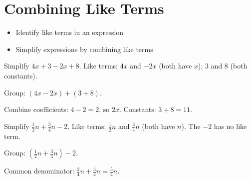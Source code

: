 \section{Combining Like Terms}

\begin{stepGoal}
\begin{itemize}
    \item Identify like terms in an expression
    \item Simplify expressions by combining like terms
\end{itemize}
\end{stepGoal}

\begin{stepVocabBox}
\end{stepVocabBox}

\begin{stepsCard}
\end{stepsCard}

\begin{stepExample}{Simplify $4x + 3 - 2x + 8$.}
     Like terms: $4x$ and $-2x$ (both have $x$); $3$ and $8$ (both constants).

     Group: $(4x - 2x) + (3 + 8)$.

     Combine coefficients: $4 - 2 = 2$, so $2x$. Constants: $3 + 8 = 11$.
\end{stepExample}

\begin{stepExample}{Simplify $\frac{1}{2}n + \frac{3}{4}n - 2$.}
     Like terms: $\frac{1}{2}n$ and $\frac{3}{4}n$ (both have $n$). The $-2$ has no like term.

     Group: $\left(\frac{1}{2}n + \frac{3}{4}n\right) - 2$.

     Common denominator: $\frac{2}{4}n + \frac{3}{4}n = \frac{5}{4}n$.
\end{stepExample}

